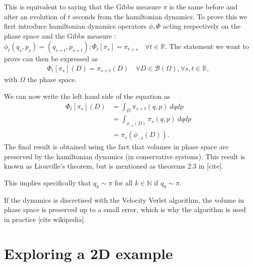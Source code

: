 \documentclass[a4paper, 12pt,oneside]{article}
\begin{document}
			This is equivalent to saying that the Gibbs measure $\pi$ is the same before and after an evolution of $t$ seconds from the hamiltonian dynamics. 
			To prove this we first introduce hamiltonian dynamics operators $\phi,\Phi$ acting respectively on the phase space and the Gibbs measure : $\phi_t(q_s,p_s)=(q_{s+t},p_{s+t});\Phi_t[\pi_s]=\pi_{t+s}\quad \forall t\in\mathbb{R}$.
			The statement we want to prove can then be expressed as 
			\begin{gather}
				\Phi_t[\pi_s](D)=\pi_{s+t}(D)\quad \forall D\in\mathcal{B}(\Omega),\forall s,t\in\mathbb{R},
			\end{gather}
			with $\Omega$ the phase space.
	
			We can now write the left hand side of the equation as
			\begin{align}
				\Phi_t[\pi_s](D)&=\int_D \pi_{s+t}(q,p)\ dqdp \\
					&=\int_{\phi_{-t}(D)}\pi_{s}(q,p)\ dqdp \\
					&=\pi_s(\phi_{-t}(D)).
			\end{align}
			The final result is obtained using the fact that volumes in phase space are preserved by the hamiltonian dynamics (in conservative systems). This result is known as Liouville's theorem, but is mentioned as theorems 2.3 in [cite].
	
			This implies specifically that $q_k\sim\pi$ for all $k\in\mathbb{N}$ if $q_0\sim \pi$. 
	
			If the dynamics is discretised with the Velocity Verlet algorithm, the volume in phase space is preserved up to a small error, which is why the algorithm is used in practice [cite wikipedia].
	\section{Exploring a 2D example}
\end{document}
